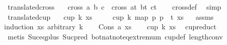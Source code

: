 \begin{isabellebody}
\isamarkupfalse%
%
\endisatagproof
{\isafoldproof}%
%
\isadelimproof
\isanewline
%
\endisadelimproof
\isanewline
{}\isamarkupfalse%
\ translated{\isacharunderscore}{\kern0pt}cross{}{\isacharcolon}{\kern0pt}\isanewline
\ \ \ {\isachardoublequoteopen}cross{}\ a\ b\ c\ {\isacharequal}{\kern0pt}\ cross{}\ {\isacharparenleft}{\kern0pt}a{\isacharplus}{\kern0pt}t{\isacharparenright}{\kern0pt}\ {\isacharparenleft}{\kern0pt}b{\isacharplus}{\kern0pt}t{\isacharparenright}{\kern0pt}\ {\isacharparenleft}{\kern0pt}c{\isacharplus}{\kern0pt}t{\isacharparenright}{\kern0pt}{\isachardoublequoteclose}\isanewline
%
\isadelimproof
\ \ %
\endisadelimproof
%
\isatagproof
{}\isamarkupfalse%
\ cross{}{\isacharunderscore}{\kern0pt}def\ \isamarkupfalse%
\ simp%
\endisatagproof
{\isafoldproof}%
%
\isadelimproof
\isanewline
%
\endisadelimproof
\isanewline
{}\isamarkupfalse%
\ translated{\isacharunderscore}{\kern0pt}cup{\isacharcolon}{\kern0pt}\isanewline
\ \ \ {\isachardoublequoteopen}cup\ k\ xs{\isachardoublequoteclose}\isanewline
\ \ \ \ \ {\isachardoublequoteopen}cup\ k\ {\isacharparenleft}{\kern0pt}map\ {\isacharparenleft}{\kern0pt}{\isasymlambda}p{\isachardot}{\kern0pt}\ p\ {\isacharplus}{\kern0pt}\ t{\isacharparenright}{\kern0pt}\ xs{\isacharparenright}{\kern0pt}{\isachardoublequoteclose}%
\isadelimproof
\ %
\endisadelimproof
%
\isatagproof
{}\isamarkupfalse%
\ assms\isanewline
{}\isamarkupfalse%
{\isacharparenleft}{\kern0pt}induction\ xs\ arbitrary{\isacharcolon}{\kern0pt}\ k{\isacharparenright}{\kern0pt}\isanewline
\ \ \isamarkupfalse%
\ {\isacharparenleft}{\kern0pt}Cons\ a\ xs{\isacharparenright}{\kern0pt}\isanewline
\ \ \isamarkupfalse%
\ {\isachardoublequoteopen}cup\ {\isacharparenleft}{\kern0pt}k{\isacharminus}{\kern0pt}{}{\isacharparenright}{\kern0pt}\ xs{\isachardoublequoteclose}\ \isamarkupfalse%
\ cup{\isacharunderscore}{\kern0pt}reduct\isanewline
\ \ \ \ \isamarkupfalse%
\ {\isacharparenleft}{\kern0pt}metis\ Suc{\isacharunderscore}{\kern0pt}eq{\isacharunderscore}{\kern0pt}plus{}\ Suc{\isacharunderscore}{\kern0pt}pred{\isacharprime}{\kern0pt}\ bot{\isacharunderscore}{\kern0pt}nat{\isacharunderscore}{\kern0pt}{}{\isachardot}{\kern0pt}not{\isacharunderscore}{\kern0pt}eq{\isacharunderscore}{\kern0pt}extremum\ cup{\isacharunderscore}{\kern0pt}def\ length{\isacharunderscore}{\kern0pt}{}{\isacharunderscore}{\kern0pt}conv\isanewline

\end{isabellebody}
